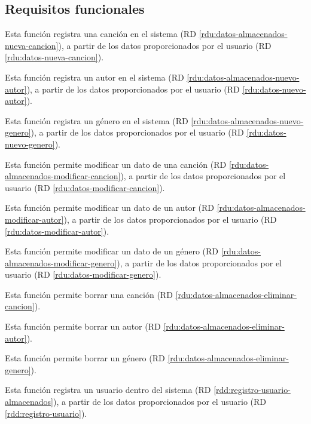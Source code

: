 \subsection{Requisitos funcionales}

Esta función registra una canción en el sistema (RD \ref{rdu:datos-almacenados-nueva-cancion}), a partir de los datos proporcionados por el usuario (RD \ref{rdu:datos-nueva-cancion}).

Esta función registra un autor en el sistema (RD \ref{rdu:datos-almacenados-nuevo-autor}), a partir de los datos proporcionados por el usuario (RD \ref{rdu:datos-nuevo-autor}).

Esta función registra un género en el sistema (RD \ref{rdu:datos-almacenados-nuevo-genero}), a partir de los datos proporcionados por el usuario (RD \ref{rdu:datos-nuevo-genero}).

Esta función permite modificar un dato de una canción (RD \ref{rdu:datos-almacenados-modificar-cancion}), a partir de los datos proporcionados por el usuario (RD \ref{rdu:datos-modificar-cancion}).

Esta función permite modificar un dato de un autor (RD \ref{rdu:datos-almacenados-modificar-autor}), a partir de los datos proporcionados por el usuario (RD \ref{rdu:datos-modificar-autor}).

Esta función permite modificar un dato de un género (RD \ref{rdu:datos-almacenados-modificar-genero}), a partir de los datos proporcionados por el usuario (RD \ref{rdu:datos-modificar-genero}).

Esta función permite borrar una canción (RD \ref{rdu:datos-almacenados-eliminar-cancion}).

Esta función permite borrar un autor (RD \ref{rdu:datos-almacenados-eliminar-autor}).

Esta función permite borrar un género (RD \ref{rdu:datos-almacenados-eliminar-genero}).


Esta función registra un usuario dentro del sistema (RD \ref{rdd:registro-usuario-almacenados}), a partir de los datos proporcionados por el usuario (RD \ref{rdd:registro-usuario}).

